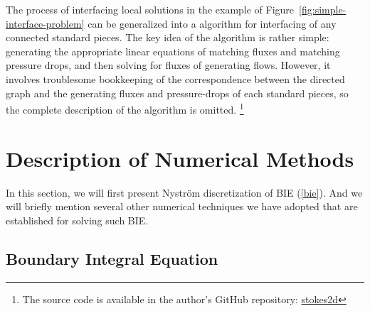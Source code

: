 \documentclass[10pt,twocolumn,letterpaper]{article}
\begin{document}
The process of interfacing local solutions in the example of Figure~\ref{fig:simple-interface-problem} 
can be generalized into a algorithm for interfacing of any connected standard pieces. 
The key idea of the algorithm is rather simple: 
generating the appropriate linear equations of matching fluxes and matching pressure drops,  
and then solving for fluxes of generating flows.
However, it involves troublesome bookkeeping of the correspondence between the directed graph 
and the generating fluxes and pressure-drops of each standard pieces, 
so the complete description of the algorithm is omitted. 
\footnote{The source code is available in the author's GitHub repository: \href{https://github.com/WangHaiYang874/stokes2d/blob/main/src/pipe_system/pipe_system.py}{stokes2d}}


\section{Description of Numerical Methods\label{sec:numericalmethod}}

In this section,
we will first present Nystr\"om discretization of BIE (\ref{bie}).
And we will briefly mention several other numerical techniques we have adopted that
are established for solving such BIE. 

\subsection{Boundary Integral Equation}
\end{document}
